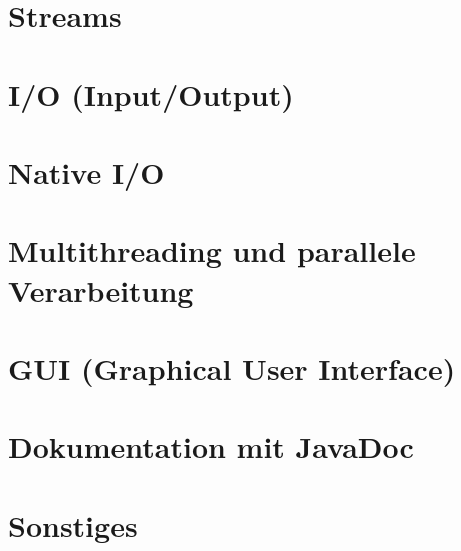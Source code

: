 \section{Streams}
	

\section{I/O (Input/Output)}
	

\section{Native I/O}
	

\section{Multithreading und parallele Verarbeitung}
	

\section{GUI (Graphical User Interface)}
	

\section{Dokumentation mit JavaDoc}
	

\section{Sonstiges}
	
